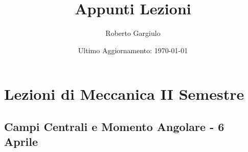 \documentclass{article}
\title{Appunti Lezioni}
\author{Roberto Gargiulo}
\date{Ultimo Aggiornamento: \today}
\begin{document}
\maketitle
\tableofcontents
\pagebreak

\section{Lezioni di Meccanica II Semestre}











\subsection{Campi Centrali e Momento Angolare - 6 Aprile}
\end{document}
